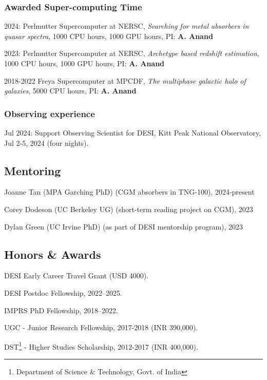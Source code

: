 \documentclass[12pt,letterpaper]{article}
\begin{document}
 \subsubsection{Awarded Super-computing Time}
  \begin{list}{}{\cvlist}
  \item 2024: Perlmutter Supercomputer at NERSC, \textit{Searching for metal absorbers in quasar spectra}, 1000 CPU hours, 1000 GPU hours, PI: \textbf{A. Anand}
  \item 2023: Perlmutter Supercomputer at NERSC,  \textit{Archetype based redshift estimation}, 1000 CPU hours, 1000 GPU hours, PI: \textbf{A. Anand}
  \item 2018-2022 Freya Supercomputer at MPCDF,  \textit{The multiphase galactic halo of galaxies}, 5000 CPU hours, PI: \textbf{A. Anand}
  \end{list}

  \subsubsection{Observing experience}
   \begin{list}{}{\cvlist}
   \item Jul 2024: Support Observing Scientist for DESI, Kitt Peak National Observatory, Jul 2-5, 2024 (four nights).
   \end{list}

\subsection{Mentoring}
\begin{list}{}{\cvlist}
\item Joanne Tan (MPA Garching PhD) (CGM absorbers in TNG-100), 2024-present
\item Corey Dodeson (UC Berkeley UG) (short-term reading project on CGM), 2023
\item Dylan Green (UC Irvine PhD) (as part of DESI mentorship program), 2023
\end{list}

\subsection{Honors \& Awards}
\begin{list}{}{\cvlist}
  \item DESI Early Career Travel Grant (USD 4000).
  \item DESI Postdoc Fellowship, 2022--2025.
  \item IMPRS PhD Fellowship, 2018--2022.
  \item UGC - Junior Research Fellowship, 2017-2018 (INR 390,000).
  \item DST\footnote{Department of Science \& Technology, Govt. of India} - Higher Studies Scholarship, 2012-2017 (INR 400,000).
\end{list}
\end{document}
